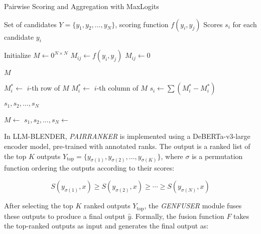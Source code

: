 \documentclass[sigconf,authordraft]{acmart}
\begin{document}
\begin{algorithm}
\caption{Pairwise Scoring and Aggregation with MaxLogits}
\label{alg:combined_algorithm}
\begin{algorithmic}[1]

\Require Set of candidates $Y = \{y_1, y_2, \dots, y_N\}$, scoring function $f(y_i, y_j)$
\Ensure Scores $s_i$ for each candidate $y_i$

\Statex
{} 
    \State Initialize $M \gets 0^{N \times N}$
                \State $M_{ij} \gets f(y_i, y_j)$ 
            \Else
                \State $M_{ij} \gets 0$ 
            \EndIf
        \EndFor
    \EndFor
    
    \Return $M$
\EndFunction

\Statex
{} 
        \State $M^*_i \gets$ $i$-th row of $M$
        \State $M_i^* \gets$ $i$-th column of $M$
        \State $s_i \gets \sum (M^*_i - M_i^*)$
    \EndFor
    
    \Return $s_1, s_2, \dots, s_N$
\EndFunction

\Statex
\State $M \gets$  
\State $s_1, s_2, \dots, s_N \gets$  

\end{algorithmic}
\end{algorithm}

In LLM-BLENDER, \textit{PAIRRANKER} is implemented using a DeBERTa-v3-large encoder model, pre-trained with annotated ranks. The output is a ranked list of the top \( K \) outputs \( Y_{\text{top}} = \{ y_{\sigma(1)}, y_{\sigma(2)}, \ldots, y_{\sigma(K)} \} \), where \( \sigma \) is a permutation function ordering the outputs according to their scores:

\[
S(y_{\sigma(1)}, x) \geq S(y_{\sigma(2)}, x) \geq \cdots \geq S(y_{\sigma(N)}, x)
\]




After selecting the top \( K \) ranked outputs \( Y_{\text{top}} \), the \textit{GENFUSER} module fuses these outputs to produce a final output \( \hat{y} \). Formally, the fusion function \( F \) takes the top-ranked outputs as input and generates the final output as:
\end{document}
